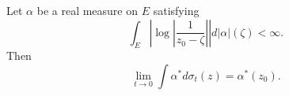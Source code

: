 
Let $\alpha$ be a real measure on $E$ satisfying
$$\int_E \left| \log \left| \frac{1}{z_0 - \zeta} \right| \right| d|\alpha|(\zeta) < \infty.$$
Then
$$\lim_{t \to 0} \int \alpha^* d\sigma_t(z) = \alpha^*(z_0).$$
